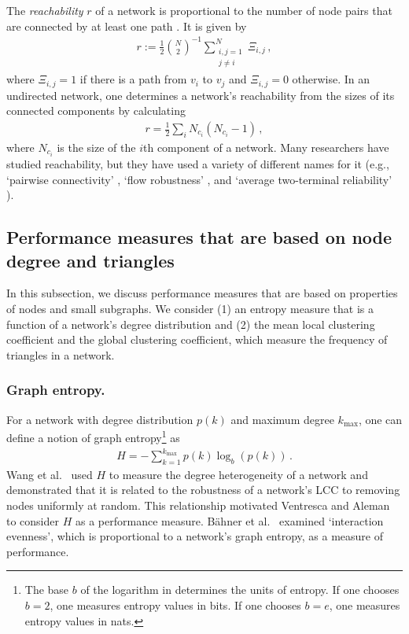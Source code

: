 \documentclass{comnet-mod}
\begin{document}
The \textit{reachability} $r$ of a network is proportional to the number of node pairs that are connected by at least one path \cite{Rai1990, Neumayer2010, Bilal2013}. It is given by
\begin{align}
	r := \frac{1}{2}\binom{N}{2}^{-1}\sum_{\substack{i,j=1\\ j\neq i}}^N \Xi_{i,j}\,,\label{eq:reachability}
\end{align}
where $\Xi_{i,j} = 1$ if there is a path from $v_i$ to $v_j$ and $\Xi_{i,j} = 0$ otherwise.
In an undirected network, one determines a network's reachability from the sizes of its connected components by calculating \cite{Ventresca2014}
\begin{align}
	r = \frac{1}{2}\sum_{i} N_{c_i}(N_{c_i}-1)\,,\nonumber
\end{align}
where $N_{c_i}$ is the size of the $i$th component of a network. Many researchers have studied reachability, but they have used a variety of different names for it (e.g., `pairwise connectivity' \cite{Ventresca2014}, `flow robustness' \cite{Zhang2013, Pinnaka2015, Alenazi2016}, and `average two-terminal reliability' \cite{Neumayer2010, Bilal2013}). 


\subsection{Performance measures that are based on node degree and triangles}\label{sec:review:triangles}


In this subsection, we discuss performance measures that are based on properties of nodes and small subgraphs. We consider (1) an entropy measure that is a function of a network's degree distribution and (2) the mean local clustering coefficient and the global clustering coefficient, which measure the frequency of triangles in a network.


\subsubsection{Graph entropy.} 

For a network with degree distribution $p(k)$ and maximum degree $k_{\textrm{max}}$, one can define a notion of graph entropy\footnote{The base $b$ of the logarithm in  determines the units of entropy. If one chooses $b = 2$, one measures entropy values in bits. If one chooses $b = e$, one measures entropy values in nats.} as \cite{Wang2006}
\begin{align}
	H = -\sum_{k=1}^{k_\textrm{max}}p(k)\log_b(p(k))\,.\label{eq:first_log}
\end{align}
Wang et al.~\cite{Wang2006} used $H$ to measure the degree heterogeneity of a network and demonstrated that it is related to the robustness of a network's LCC to removing nodes uniformly at random. This relationship motivated Ventresca and Aleman~\cite{Ventresca2014} to consider $H$ as a performance measure. B\"ahner et al.~\cite{Baehner2017} examined `interaction evenness', which is proportional to a network's graph entropy, as a measure of performance.  
\end{document}
